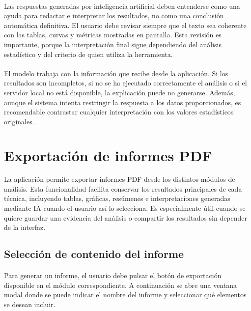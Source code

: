 \paragraph*{}Las respuestas generadas por inteligencia artificial deben entenderse como una ayuda para redactar e interpretar los resultados, no como una conclusión automática definitiva. El usuario debe revisar siempre que el texto sea coherente con las tablas, curvas y métricas mostradas en pantalla. Esta revisión es importante, porque la interpretación final sigue dependiendo del análisis estadístico y del criterio de quien utiliza la herramienta.

\paragraph*{}El modelo trabaja con la información que recibe desde la aplicación. Si los resultados son incompletos, si no se ha ejecutado correctamente el análisis o si el servidor local no está disponible, la explicación puede no generarse. Además, aunque el sistema intenta restringir la respuesta a los datos proporcionados, es recomendable contrastar cualquier interpretación con los valores estadísticos originales.

\section{Exportación de informes PDF}

\paragraph*{}La aplicación permite exportar informes PDF desde los distintos módulos de análisis. Esta funcionalidad facilita conservar los resultados principales de cada técnica, incluyendo tablas, gráficas, resúmenes e interpretaciones generadas mediante IA cuando el usuario así lo selecciona. Es especialmente útil cuando se quiere guardar una evidencia del análisis o compartir los resultados sin depender de la interfaz.

\subsection{Selección de contenido del informe}

\paragraph*{}Para generar un informe, el usuario debe pulsar el botón de exportación disponible en el módulo correspondiente. A continuación se abre una ventana modal donde se puede indicar el nombre del informe y seleccionar qué elementos se desean incluir.

